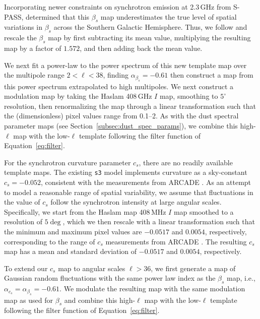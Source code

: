 \documentclass[twocolumn]{aastex631}
\begin{document}
Incorporating newer constraints on synchrotron emission at 2.3\,GHz from S-PASS, \citet{Krachmalnicoff:2018} determined that this $\beta_s$ map underestimates the true level of spatial variations in $\beta_s$ across the Southern Galactic Hemisphere. Thus, we follow \citet{Krachmalnicoff:2018} and rescale the $\beta_s$ map by first subtracting its mean value, multiplying the resulting map by a factor of $1.572$, and then adding back the mean value.

We next fit a power-law to the power spectrum of this new template map over the multipole range $2<\ell<38$, finding $\alpha_{\beta_s}=-0.61$ then construct a map from this power spectrum extrapolated to high multipoles. We next construct a modulation map by taking the Haslam 408\,GHz $I$ map, smoothing to $5^\circ$ resolution, then renormalizing the map through a linear transformation such that the (dimensionless) pixel values range from 0.1--2. As with the dust spectral parameter maps (see Section~\ref{subsec:dust_spec_params}), we combine this high-$\ell$ map with the low-$\ell$ template following the filter function of Equation~\ref{eq:filter}.
 
For the synchrotron curvature parameter $c_s$, there are no readily available template maps. The existing \texttt{s3} model implements curvature as a sky-constant $c_s = -0.052$, consistent with the measurements from ARCADE \citep[$c_s=-0.052 \pm 0.005$][]{Kogut:2012}. As an attempt to model a reasonable range of spatial variability, we assume that fluctuations in the value of $c_s$ follow the synchrotron intensity at large angular scales. Specifically, we start from the Haslam map 408\,MHz $I$ map smoothed to a resolution of $5 \deg$, which we then rescale with a linear transformation such that the minimum and maximum pixel values are  $-0.0517$ and $0.0054$, respectively, corresponding to the range of $c_s$ measurements from ARCADE \citep{Kogut:2012}. The resulting $c_s$ map has a mean and standard deviation of $-0.0517$ and $0.0054$, respectively. 


To extend our $c_s$ map to angular scales $\ell > 36$, we first generate a map of Gaussian random fluctuations with the same power law index as the $\beta_s$ map, i.e., $\alpha _{c_s}=\alpha _{\beta_s} = -0.61$. We modulate the resulting map with the same modulation map as used for $\beta_s$ and combine this high-$\ell$ map with the low-$\ell$ template following the filter function of Equation~\ref{eq:filter}.
\end{document}
